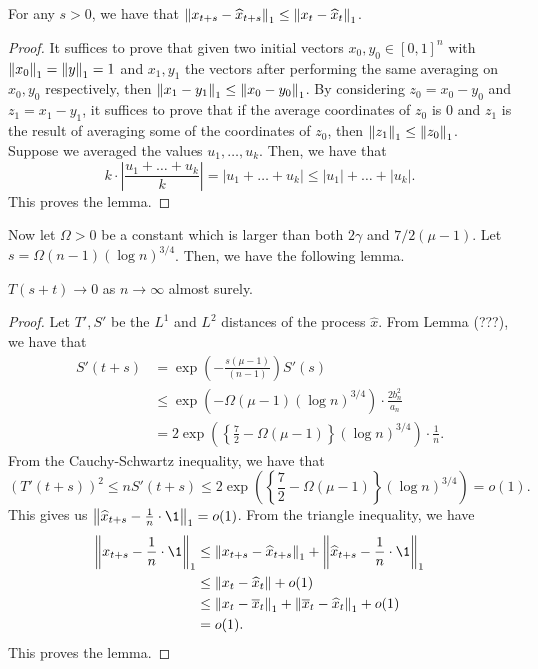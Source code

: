 \documentclass[12pt]{article}
\begin{document}
\begin{lem}
	For any $s > 0$, we have that $\left\lVert x_{t+s} - \widehat{x}_{t+s} \right\rVert_1 \leq \left\lVert x_t - \widehat{x}_t \right\rVert_1$. 
\end{lem}
\begin{proof}
	It suffices to prove that given two initial vectors $x_0, y_0 \in [0, 1]^n$ with $\left\lVert x_0 \right\rVert_1 =\left\lVert y \right\rVert_1 = 1$ and $x_1, y_1$ the vectors after performing the same averaging on $x_0, y_0$ respectively, then $\left\lVert x_1 - y_1 \right\rVert_1 \leq \left\lVert x_0 - y_0 \right\rVert_1$. By considering $z_0 = x_0 - y_0$ and $z_1 = x_1 - y_1$, it suffices to prove that if the average coordinates of $z_0$ is $0$ and $z_1$ is the result of averaging some of the coordinates of $z_0$, then $\left\lVert z_1 \right\rVert_1 \leq \left\lVert z_0 \right\rVert_1$. Suppose we averaged the values $u_1, \ldots, u_k$. Then, we have that
	\[
		k \cdot \left | \frac{u_1 + \ldots + u_k}{k} \right | = |u_1 + \ldots + u_k| \leq |u_1| + \ldots + |u_k|.
	\]
	This proves the lemma. 
\end{proof}

Now let $\Omega > 0$ be a constant which is larger than both $2\gamma$ and $7 / 2(\mu - 1)$. Let $s = \Omega (n-1) (\log n)^{3/4}$. Then, we have the following lemma. 

\begin{lem}
	$T(s+t) \to 0$ as $n \to \infty$ almost surely. 
\end{lem}

\begin{proof}
	Let $T', S'$ be the $L^1$ and $L^2$ distances of the process $\widehat{x}$. From Lemma (???), we have that
	\begin{align*}
		S'(t+s) & = \exp \left ( - \frac{s (\mu-1)}{(n-1)} \right ) S'(s) \\
		& \leq \exp(- \Omega (\mu-1) (\log n)^{3/4}) \cdot \frac{2b_n^2}{a_n} \\
		& = 2 \exp \left ( \left \{ \frac{7}{2} - \Omega (\mu - 1) \right \} (\log n)^{3/4} \right ) \cdot \frac{1}{n}.
	\end{align*}
	From the Cauchy-Schwartz inequality, we have that
	\[
		(T'(t+s))^2 \leq n S'(t+s) \leq 2 \exp \left ( \left \{ \frac{7}{2} - \Omega (\mu - 1) \right \} (\log n)^{3/4} \right ) = o(1).
	\]
	This gives us $\norm{\widehat{x}_{t+s} - \frac{1}{n} \cdot \1}_1 = o(1)$. From the triangle inequality, we have
	\begin{align*}
		\norm{x_{t+s} - \frac{1}{n} \cdot \1}_1 & \leq \norm{x_{t+s} - \widehat{x}_{t+s}}_1 + \norm{\widehat{x}_{t+s} - \frac{1}{n} \cdot \1}_1 \\
		& \leq \norm{x_t - \widehat{x}_t} + o(1) \\
		& \leq \norm{x_t - \overline{x}_t}_1 + \norm{\overline{x}_t - \widehat{x}_t}_1 + o(1) \\
		& = o(1).
	\end{align*}
	This proves the lemma. 
\end{proof}


\end{document}
